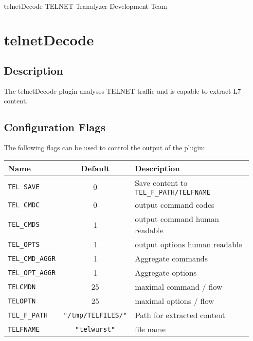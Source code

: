 \documentclass[documentation]{subfiles}
\begin{document}
\trantitle
    {telnetDecode}
    {TELNET}
    {Tranalyzer Development Team} %

\section{telnetDecode}\label{s:telnetDecode}

\subsection{Description}
The telnetDecode plugin analyses TELNET traffic and is capable to extract L7 content.

\subsection{Configuration Flags}
The following flags can be used to control the output of the plugin:
\begin{longtable}{lcl}
    \toprule
    {\bf Name} & {\bf Default} & {\bf Description}\\
    \midrule\endhead%
    {\tt TEL\_SAVE}      & 0  & Save content to {\tt TEL\_F\_PATH/TELFNAME}\\
    {\tt TEL\_CMDC}      & 0  & output command codes\\
    {\tt TEL\_CMDS}      & 1  & output command human readable\\
    {\tt TEL\_OPTS}      & 1  & output options human readable\\
    {\tt TEL\_CMD\_AGGR} & 1  & Aggregate commands\\
    {\tt TEL\_OPT\_AGGR} & 1  & Aggregate options\\
    {\tt TELCMDN}        & 25 & maximal command / flow\\
    {\tt TELOPTN}        & 25 & maximal options / flow\\
    {\tt TEL\_F\_PATH} & {\tt\small "/tmp/TELFILES/"} & Path for extracted content\\
    {\tt TELFNAME}     & {\tt\small "telwurst"}       & file name \\
    \bottomrule
\end{longtable}
\end{document}
